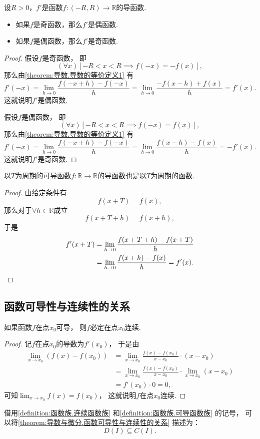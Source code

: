 \begin{proposition}\label{theorem:导数与微分.导函数的奇偶性}
设\(R>0\)，\(f'\)是函数\(f\colon(-R,R)\to\mathbb{R}\)的导函数.
\begin{itemize}
	\item 如果\(f\)是奇函数，那么\(f'\)是偶函数.
	\item 如果\(f\)是偶函数，那么\(f'\)是奇函数.
\end{itemize}
\begin{proof}
假设\(f\)是奇函数，
即\[
	(\forall x)
	[
		-R < x < R
		\implies
		f(-x) = -f(x)
	],
\]
那么由\cref{theorem:导数.导数的等价定义1} 有\[
	f'(-x)
	= \lim_{h\to0} \frac{f(-x+h)-f(-x)}{h}
	= \lim_{h\to0} \frac{-f(x-h)+f(x)}{h}
	= f'(x).
\]
这就说明\(f'\)是偶函数.

假设\(f\)是偶函数，
即\[
	(\forall x)
	[
		-R < x < R
		\implies
		f(-x) = f(x)
	],
\]
那么由\cref{theorem:导数.导数的等价定义1} 有\[
	f'(-x)
	= \lim_{h\to0} \frac{f(-x+h)-f(-x)}{h}
	= \lim_{h\to0} \frac{f(x-h)-f(x)}{h}
	= -f'(x).
\]
这就说明\(f'\)是奇函数.
\end{proof}
\end{proposition}
\begin{proposition}\label{theorem:导数与微分.导函数的周期性}
以\(T\)为周期的可导函数\(f\colon\mathbb{R}\to\mathbb{R}\)的导函数也是以\(T\)为周期的函数.
\begin{proof}
由给定条件有\[
	f(x+T) = f(x),
\]
那么对于\(\forall h\in\mathbb{R}\)成立\[
	f(x+T+h) = f(x+h),
\]
于是\begin{align*}
	f'(x+T)
	&= \lim_{h\to0} \frac{f(x+T+h) - f(x+T)}{h} \\
	&= \lim_{h\to0} \frac{f(x+h) - f(x)}{h}
	= f'(x).
	\qedhere
\end{align*}
\end{proof}
\end{proposition}

\subsection{函数可导性与连续性的关系}
\begin{theorem}\label{theorem:导数与微分.函数可导性与连续性的关系}
如果函数\(f\)在点\(x_0\)可导，
则\(f\)必定在点\(x_0\)连续.
\begin{proof}
记\(f\)在点\(x_0\)的导数为\(f'(x_0)\)，
于是由\begin{align*}
	\lim_{x \to x_0} (f(x) - f(x_0))
	&= \lim_{x \to x_0} \frac{f(x) - f(x_0)}{x - x_0} \cdot (x - x_0) \\
	&= \lim_{x \to x_0} \frac{f(x) - f(x_0)}{x - x_0} \cdot \lim_{x \to x_0} (x - x_0) \\
	&= f'(x_0) \cdot 0
	= 0,
\end{align*}
可知\(\lim_{x \to x_0} f(x) = f(x_0)\)，
这就说明\(f\)在点\(x_0\)连续.
\end{proof}
\end{theorem}
借用\cref{definition:函数族.连续函数族} 和\cref{definition:函数族.可导函数族} 的记号，
可以将\cref{theorem:导数与微分.函数可导性与连续性的关系} 描述为：\[
	D(I) \subseteq C(I).
\]

